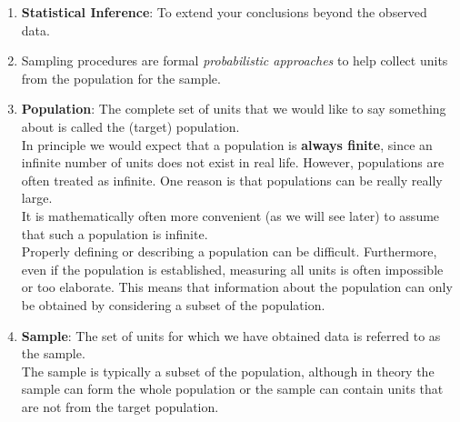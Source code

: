 \begin{enumerate}
    \item \textbf{Statistical Inference}\label{Sampling Plans/Statistical Inference}: To extend your conclusions beyond the observed data. 
    \hfill \cite{statistics/book/Statistics-for-Data-Scientists/Maurits-Kaptein}

    \item Sampling procedures are formal \textit{probabilistic approaches} to help collect units from the population for the sample.
    \hfill \cite{statistics/book/Statistics-for-Data-Scientists/Maurits-Kaptein}

    \item \textbf{Population}\label{Sampling Plans/Population}: The complete set of units that we would like to say something about is called the (target) population.
    \hfill \cite{statistics/book/Statistics-for-Data-Scientists/Maurits-Kaptein}
    \\
    In principle we would expect that a population is \textbf{always finite}, since an infinite number of units does not exist in real life. However, populations are often treated as infinite. One reason is that populations can be really really large.
    \hfill \cite{statistics/book/Statistics-for-Data-Scientists/Maurits-Kaptein}
    \\
    It is mathematically often more convenient (as we will see later) to assume that such a population is infinite.
    \hfill \cite{statistics/book/Statistics-for-Data-Scientists/Maurits-Kaptein}
    \\
    Properly defining or describing a population can be difficult. Furthermore, even if the population is established, measuring all units is often impossible or too elaborate. This means that information about the population can only be obtained by considering a subset of the population.
    \hfill \cite{statistics/book/Statistics-for-Data-Scientists/Maurits-Kaptein}

    \item \textbf{Sample}\label{Sampling Plans/Sample}: The set of units for which we have obtained data is referred to as the sample. 
    \hfill \cite{statistics/book/Statistics-for-Data-Scientists/Maurits-Kaptein}
    \\
    The sample is typically a subset of the population, although in theory the sample can form the whole population or the sample can contain units that are not from the target population. 
    \hfill \cite{statistics/book/Statistics-for-Data-Scientists/Maurits-Kaptein}


\end{enumerate}
